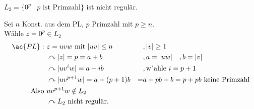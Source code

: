 \begin{Bsp*}
$L_2 = \{0^p \mid p\text{ ist Primzahl}\}$ ist nicht regulär.

Sei $n$ Konst. aus dem \ac{PL}, $p$ Primzahl mit $p \geq n$.\\
Wähle $z=0^p \in L_2$
\begin{align*}
        \ac{PL}:\ &z=uvw \text{ mit } |uv|\leq n &&,|v| \geq 1\\
        &\curvearrowright |z|= p=a+b &&, a = |uw| \quad, b= |v|\\
        &\curvearrowright |uv^iw| = a + ib &&, \text{w"ahle }i=p+1\\
        &\curvearrowright |uv^{p+1}w| = a + (p+1)b & =& a + pb + b = p+pb \text{ keine Primzahl} \\
        \text{Also } &uv^{p+1}w \notin L_2\\
        &\curvearrowright L_2\text{ nicht regulär.}
\end{align*}
\end{Bsp*}

